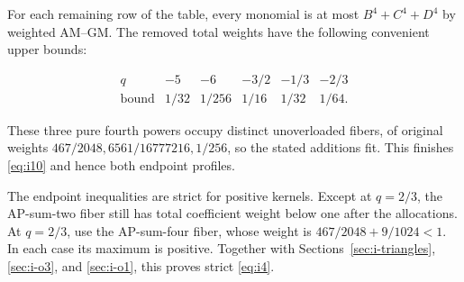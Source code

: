 For each remaining row of the table, every monomial is at most
\(B^4+C^4+D^4\) by weighted AM--GM. The removed total weights have the
following convenient upper bounds:

\[
\begin{array}{c|ccccc}
q&-5&-6&-3/2&-1/3&-2/3\\\hline
\text{bound}&1/32&1/256&1/16&1/32&1/64.
\end{array}
\]

These three pure fourth powers occupy distinct unoverloaded fibers, of
original weights \(467/2048,6561/16777216,1/256\), so the stated additions
fit. This finishes \eqref{eq:i10} and hence both endpoint profiles.

The endpoint inequalities are strict for positive kernels. Except at
\(q=2/3\), the AP-sum-two fiber still has total coefficient weight below
one after the allocations. At \(q=2/3\), use the AP-sum-four fiber, whose
weight is \(467/2048+9/1024<1\). In each case its maximum is positive.
Together with Sections~\ref{sec:i-triangles}, \ref{sec:i-o3}, and
\ref{sec:i-o1}, this proves strict \eqref{eq:i4}.
